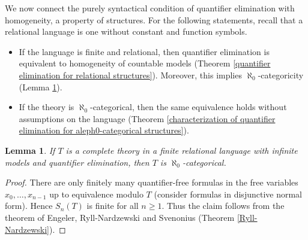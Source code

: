 \documentclass[10pt]{amsart}
\newtheorem{lemma}[theorem]{Lemma}
\theoremstyle{definition}
\theoremstyle{remark}
\begin{document}
We now connect the purely syntactical condition of quantifier elimination with homogeneity, a property of structures. 
For the following statements, recall that a relational language is one without constant and function symbols. 
\begin{itemize} 
\item 
If the language is finite and relational, then quantifier elimination is equivalent to homogeneity of countable models (Theorem \ref{quantifier elimination for relational structures}). Moreover, this implies $\aleph_0$-categoricity (Lemma \ref{quantifier elimination and categoricity for relational structures}). 
\item 
If the theory is $\aleph_0$-categorical, then the same equivalence 
holds without assumptions on the language (Theorem \ref{characterization of quantifier elimination for aleph0-categorical structures}). 
\end{itemize} 

\begin{lemma} \label{quantifier elimination and categoricity for relational structures} 
If $T$ is a complete theory in a finite relational language with infinite models and quantifier elimination, then $T$ is $\aleph_0$-categorical. 
\end{lemma} 
\begin{proof} 
There are only finitely many quantifier-free formulas in the free variables $x_0,\dots,x_{n-1}$ up to equivalence modulo $T$ (consider formulas in disjunctive normal form). Hence $S_n(T)$ is finite for all $n\geq 1$. Thus the claim follows from the theorem of Engeler, Ryll-Nardzewski and Svenonius (Theorem \ref{Ryll-Nardzewski}). 
\end{proof} 
\end{document}
